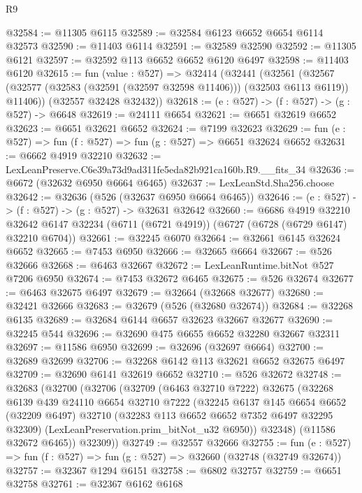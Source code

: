 \begin{lexlean}{R9}
\begin{coremodule}
@32584 := @11305 @6115
@32589 := @32584 @6123 @6652 @6654 @6114 @32573
@32590 := @11403 @6114
@32591 := @32589 @32590
@32592 := @11305 @6121
@32597 := @32592 @113 @6652 @6652 @6120 @6497
@32598 := @11403 @6120
@32615 := fun (value : @527) =>
  @32414
    (@32441
      (@32561
        (@32567 (@32577 (@32583 (@32591 (@32597 @32598 @11406))) (@32503 @6113 @6119)) @11406))
      (@32557 @32428 @32432))
@32618 := (e : @527) -> (f : @527) -> (g : @527) -> @6648
@32619 := @24111 @6654
@32621 := @6651 @32619 @6652
@32623 := @6651 @32621 @6652
@32624 := @7199 @32623
@32629 := fun (e : @527) => fun (f : @527) => fun (g : @527) => @6651 @32624 @6652
@32631 := @6662 @4919 @32210
@32632 := LexLeanPreserve.C6e39a73d9ad311fe5eda82b921ca160b.R9.__fits_34
@32636 := @6672 (@32632 @6950 @6664 @6465)
@32637 := LexLeanStd.Sha256.choose
@32642 := @32636 (@526 (@32637 @6950 @6664 @6465))
@32646 := (e : @527) -> (f : @527) -> (g : @527) -> @32631 @32642
@32660 := @6686
    @4919
    @32210
    @32642
    @6147
    @32234
    (@6711 (@6721 @4919))
    (@6727 (@6728 (@6729 @6147) @32210 @6704))
@32661 := @32245 @6070
@32664 := @32661 @6145 @32624 @6652
@32665 := @7453 @6950
@32666 := @32665 @6664
@32667 := @526 @32666
@32668 := @6463 @32667
@32672 := LexLeanRuntime.bitNot @527 @7206 @6950
@32674 := @7453 @32672 @6465
@32675 := @526 @32674
@32677 := @6463 @32675 @6497
@32679 := @32664 (@32668 @32677)
@32680 := @32421 @32666
@32683 := @32679 (@526 (@32680 @32674))
@32684 := @32268 @6135
@32689 := @32684 @6144 @6657 @32623 @32667 @32677
@32690 := @32245 @544
@32696 := @32690 @475 @6655 @6652 @32280 @32667 @32311
@32697 := @11586 @6950
@32699 := @32696 (@32697 @6664)
@32700 := @32689 @32699
@32706 := @32268 @6142 @113 @32621 @6652 @32675 @6497
@32709 := @32690 @6141 @32619 @6652
@32710 := @526 @32672
@32748 := @32683
    (@32700
      (@32706
        (@32709
          (@6463 @32710 @7222)
          @32675
          (@32268
            @6139
            @439
            @24110
            @6654
            @32710
            @7222
            (@32245
              @6137
              @145
              @6654
              @6652
              (@32209 @6497)
              @32710
              (@32283 @113 @6652 @6652 @7352 @6497 @32295 @32309)
              (LexLeanPreservation.prim_bitNot_u32 @6950))
            @32348)
          (@11586 @32672 @6465))
        @32309))
@32749 := @32557 @32666
@32755 := fun (e : @527) => fun (f : @527) => fun (g : @527) => @32660 (@32748 (@32749 @32674))
@32757 := @32367 @1294 @6151
@32758 := @6802 @32757
@32759 := @6651 @32758
@32761 := @32367 @6162 @6168

\end{coremodule}
\end{lexlean}

